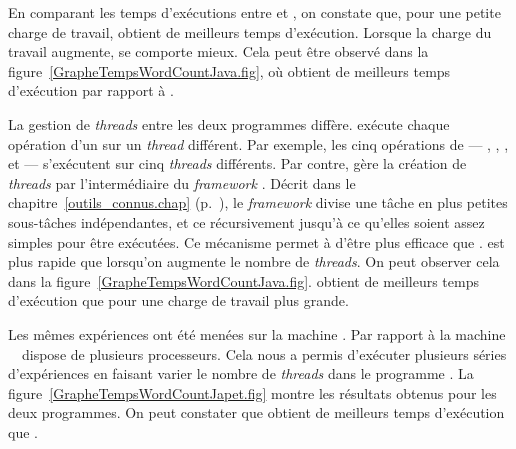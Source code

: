 En comparant les temps d'ex\'ecutions entre  et , on constate que, pour une petite charge de travail,  obtient de meilleurs temps d'ex\'ecution. Lorsque la charge du travail augmente,  se comporte mieux. Cela peut \^etre observ\'e dans la figure~\ref{GrapheTempsWordCountJava.fig}, o\`u  obtient de meilleurs temps d'ex\'ecution par rapport \`a . 

La gestion de \emph{threads} entre les deux programmes diff\`ere.  ex\'ecute chaque op\'eration d'un  sur un \emph{thread} diff\'erent. Par exemple, les cinq op\'erations de  --- , , ,  et  --- s'ex\'ecutent sur cinq \emph{threads} diff\'erents. Par contre,  g\`ere la cr\'eation de \emph{threads} par l'interm\'ediaire du \emph{framework} . D\'ecrit dans le chapitre~\ref{outils_connus.chap} (p.~\pageref{forkjoin.sect}), le \emph{framework} divise une t\^ache en plus petites sous-t\^aches ind\'ependantes, et ce r\'ecursivement jusqu'\`a ce qu'elles soient assez simples pour \^etre ex\'ecut\'ees. Ce m\'ecanisme permet \`a  d'\^etre plus efficace que .  est plus rapide que  lorsqu'on augmente le nombre de \emph{threads}. On peut observer cela dans la figure~\ref{GrapheTempsWordCountJava.fig}.  obtient de meilleurs temps d'ex\'ecution que  pour une charge de travail plus grande.

Les m\^emes exp\'eriences ont \'et\'e men\'ees sur la machine . Par rapport \`a la machine \, \ dispose de plusieurs processeurs. Cela nous a permis d'ex\'ecuter plusieurs s\'eries d'exp\'eriences en faisant varier le nombre de \emph{threads} dans le programme . La figure~\ref{GrapheTempsWordCountJapet.fig} montre les r\'esultats obtenus pour les deux programmes. On peut constater que  obtient de meilleurs temps d'ex\'ecution  que . 


